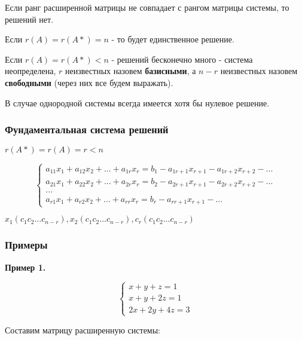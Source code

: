 \documentclass{article}
\begin{document}
\begin{flushleft}
Если ранг расширенной матрицы не совпадает с рангом матрицы системы, то решений нет.

Если $r(A) = r(A*) = n$ - то будет единственное решение.

Если $r(A) = r(A*) < n$ - решений бесконечно много - система неопределена, $r$ неизвестных назовем \textbf{базисными}, а $n - r$ неизвестных назовем \textbf{свободными} (через них все будем выражать).

\hfill

В случае однородной системы всегда имеется хотя бы нулевое решение.

\pagebreak
\subsubsection{Фундаментальная система решений}

$r(A*) = r(A) = r < n$

\begin{equation}
    \begin{cases}
        a_{11} x_1 + a_{12} x_2 + ... + a_{1r} x_r = b_1 - a_{1r + 1} x_{r + 1} - a_{1r + 2} x_{r + 2} - ... \\
        a_{21} x_1 + a_{22} x_2 + ... + a_{2r} x_r = b_2 - a_{2r + 1} x_{r + 1} - a_{2r + 2} x_{r + 2} - ... \\
        ... \\
        a_{r1} x_1 + a_{r2} x_2 + ... + a_{r r} x_r = b_r - a_{r r + 1} x_{r + 1} - ...
    \end{cases}
\end{equation}

\hfill

$x_1(c_1 c_2 ... c_{n - r}), x_2(c_1 c_2 ... c_{n - r}), c_r (c_1 c_2 ... c_{n - r})$

\subsubsection{Примеры}

\textbf{Пример 1.}

\begin{equation}
    \begin{cases}
        x + y + z = 1 \\
        x + y + 2z = 1 \\
        2x + 2y + 4z = 3
    \end{cases}
\end{equation}

Составим матрицу расширенную системы:


\end{flushleft}
\end{document}
